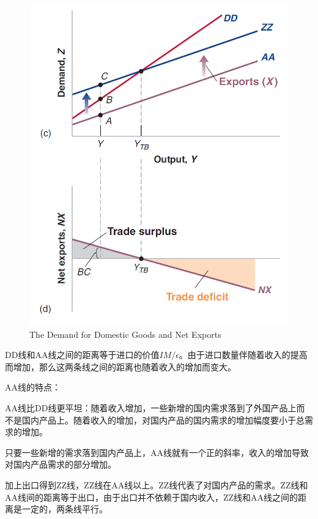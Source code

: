 \documentclass{article}
\begin{document}
\begin{figure}[H] %
	\centering %
	\includegraphics[width=1\textwidth]{18_2} %
	\caption{The Demand for Domestic
		Goods and Net Exports} %
	\label{Fig.main3} %
\end{figure}

DD线和AA线之间的距离等于进口的价值$ IM/\epsilon $。由于进口数量伴随着收入的提高而增加，那么这两条线之间的距离也随着收入的增加而变大。

AA线的特点：

AA线比DD线更平坦：随着收入增加，一些新增的国内需求落到了外国产品上而不是国内产品上。随着收入的增加，对国内产品的国内需求的增加幅度要小于总需求的增加。

只要一些新增的需求落到国内产品上，AA线就有一个正的斜率，收入的增加导致对国内产品需求的部分增加。

加上出口得到ZZ线，ZZ线在AA线以上。ZZ线代表了对国内产品的需求。ZZ线和AA线间的距离等于出口，由于出口并不依赖于国内收入，ZZ线和AA线之间的距离是一定的，两条线平行。
\end{document}
